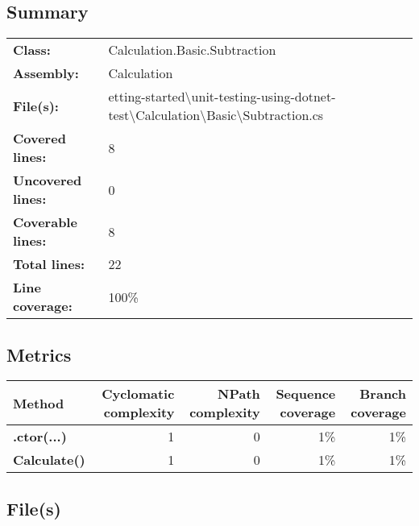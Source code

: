 \documentclass[a4paper,landscape,10pt]{article}
\begin{document}
\subsection{Summary}
\begin{longtable}[l]{ll}
\textbf{Class:} & Calculation.Basic.Subtraction\\
\textbf{Assembly:} & Calculation\\
\textbf{File(s):} & \begin{minipage}[t]{12cm}{etting-started\textbackslash unit-testing-using-dotnet-test\textbackslash Calculation\textbackslash Basic\textbackslash Subtraction.cs}\end{minipage} \\
\textbf{Covered lines:} & 8\\
\textbf{Uncovered lines:} & 0\\
\textbf{Coverable lines:} & 8\\
\textbf{Total lines:} & 22\\
\textbf{Line coverage:} & 100\%\\
\end{longtable}
\subsection{Metrics}
\begin{longtable}[l]{|l|r|r|r|r|}
\hline
\textbf{Method} & \textbf{Cyclomatic complexity} & \textbf{NPath complexity} & \textbf{Sequence coverage} & \textbf{Branch coverage}\\
\hline
\textbf{.ctor(...)} & 1 & 0 & 1\% & 1\%\\
\hline
\textbf{Calculate()} & 1 & 0 & 1\% & 1\%\\
\hline
\end{longtable}
\subsection{File(s)}
\end{document}
